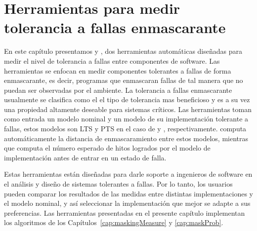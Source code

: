 \chapter{Herramientas para medir tolerancia a fallas enmascarante}
\label{cap:tool}

En este capítulo presentamos {\MaskD} y {\Tolerange}, dos herramientas automáticas diseñadas para medir el nivel de tolerancia a fallas entre componentes de software. 
Las herramientas se enfocan en medir componentes tolerantes a fallas de forma enmascarante, es decir, programas que enmascaran fallas de tal manera que no puedan ser observadas por el ambiente. La tolerancia a fallas enmascarante usualmente se clasifica como el el tipo de tolerancia mas beneficioso y es a su vez una propiedad altamente deseable para sistemas críticos. 
Las herramientas toman como entrada un modelo nominal y un modelo de su implementación tolerante a fallas, estos modelos son LTS y PTS en el caso de {\MaskD} y {\Tolerange}, respectivamente. {\MaskD} computa automáticamente la distancia de enmascaramiento entre estos modelos, mientras que {\Tolerange} computa el número esperado de hitos logrados por el modelo de implementación antes de entrar en un estado de falla.  

Estas herramientas están diseñadas para darle soporte a ingenieros de software en el análisis y diseño de sistemas tolerantes a fallas. 
Por lo tanto, los usuarios pueden comparar los resultados de las medidas entre distintas implementaciones y el modelo nominal, y así seleccionar la implementación que mejor se adapte a sus preferencias.
Las herramientas presentadas en el presente capítulo implementan los algoritmos de los Capítulos~\ref{cap:maskingMeasure} y \ref{cap:maskProb}.










